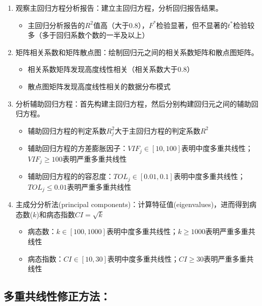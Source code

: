 \documentclass[12pt,(landscape,a4paper),(portrait,a4paper)]{article}
\providecommand{\tightlist}{%
  \setlength{\itemsep}{0pt}\setlength{\parskip}{0pt}}
\begin{document}
\begin{enumerate}
\def\labelenumi{\alph{enumi}.}
\tightlist
\item
  观察主回归方程分析报告：建立主回归方程，分析回归报告结果。

  \begin{itemize}
  \tightlist
  \item
    主回归分析报告的\(R^2\)值高（大于0.8），\(F^{\ast}\)检验显著，但不显著的\(t^\ast\)检验较多（多于回归系数个数的一半及以上）
  \end{itemize}
\item
  矩阵相关系数和矩阵散点图：绘制回归元之间的相关系数矩阵和散点图矩阵。

  \begin{itemize}
  \tightlist
  \item
    相关系数矩阵发现高度线性相关（相关系数大于0.8）
  \item
    散点图矩阵发现高度线性相关的数据分布模式
  \end{itemize}
\item
  分析辅助回归方程：首先构建主回归方程，然后分别构建回归元之间的辅助回归方程。

  \begin{itemize}
  \tightlist
  \item
    辅助回归方程的判定系数\(R^2_j\)大于主回归方程的判定系数\(R^2\)
  \item
    辅助回归方程的方差膨胀因子：\(VIF_j\in[10,100]\)表明中度多重共线性；\(VIF_j\geq{100}\)表明严重多重共线性
  \item
    辅助回归方程的的容忍度：\(TOL_j\in[0.01,0.1]\)表明中度多重共线性；\(TOL_j\leq{0.01}\)表明严重多重共线性
  \end{itemize}
\item
  主成分分析法(principal
  components)：计算特征值(eigenvalues)，进而得到病态数(\(k\))和病态指数\(CI=\sqrt{k}\)

  \begin{itemize}
  \tightlist
  \item
    病态数：\(k \in[100,1000]\)表明中度多重共线性；\(k \geq{1000}\)表明严重多重共线性
  \item
    病态指数：\(CI \in[10,30]\)表明中度多重共线性；\(CI \geq{30}\)表明严重多重共线性
  \end{itemize}
\end{enumerate}

\subsection{多重共线性修正方法：}
\end{document}
